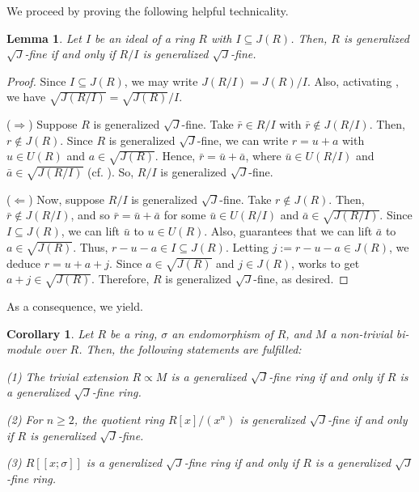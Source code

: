 \documentclass[12pt]{amsart}
\newtheorem{lemma}[theorem]{Lemma}
\newtheorem{corollary}[theorem]{Corollary}
\theoremstyle{definition}
\begin{document}
We proceed by proving the following helpful technicality.

\begin{lemma}\label{2.10}
Let \( I \) be an ideal of a ring \( R \) with \( I \subseteq J(R) \). Then, \( R \) is generalized $\sqrt{J}$-fine if and only if \( R/I \) is generalized $\sqrt{J}$-fine.
\end{lemma}

\begin{proof}
Since \( I \subseteq J(R) \), we may write \( J(R/I) = J(R)/I \). Also, activating \cite[Lemma 2.1(5)]{DDE}, we have \(\sqrt{J(R/I)} = \sqrt{J(R)}/I\).
	
(\(\Rightarrow\)) Suppose \( R \) is generalized \(\sqrt{J}\)-fine. Take \( \bar{r} \in R/I \) with \( \bar{r} \notin J(R/I) \). Then, \( r \notin J(R) \). Since \( R \) is generalized \(\sqrt{J}\)-fine, we can write \( r = u + a \) with \( u \in U(R) \) and \( a \in \sqrt{J(R)} \). Hence, \( \bar{r} = \bar{u} + \bar{a} \), where \( \bar{u} \in U(R/I) \) and \( \bar{a} \in \sqrt{J(R/I)} \) (cf. \cite[Lemma 2.1(5)]{DDE}). So, \( R/I \) is generalized \(\sqrt{J}\)-fine.
	
(\(\Leftarrow\)) Now, suppose \( R/I \) is generalized \(\sqrt{J}\)-fine. Take \( r \notin J(R) \). Then, \( \bar{r} \notin J(R/I) \), and so \( \bar{r} = \bar{u} + \bar{a} \) for some \( \bar{u} \in U(R/I) \) and \( \bar{a} \in \sqrt{J(R/I)} \). Since \( I \subseteq J(R) \), we can lift \( \bar{u} \) to \( u \in U(R) \). Also, \cite[Lemma 2.1(5)]{DDE} guarantees that we can lift \( \bar{a} \) to \( a \in \sqrt{J(R)} \). Thus, \( r - u - a \in I \subseteq J(R) \). Letting \( j := r - u - a \in J(R) \), we deduce
$
	r = u + a + j.
$
Since \( a \in \sqrt{J(R)} \) and \( j \in J(R) \), \cite[Lemma 2.11(1)]{DDE} works to get \( a + j \in \sqrt{J(R)} \). Therefore, \( R \) is generalized \(\sqrt{J}\)-fine, as desired.
\end{proof}

As a consequence, we yield.

\begin{corollary}
Let \( R \) be a ring, \( \sigma \) an endomorphism of \( R \), and \( M \) a non-trivial bi-module over \( R \). Then, the following statements are fulfilled:
	
(1) The trivial extension \( R \propto M \) is a generalized \(\sqrt{J}\)-fine ring if and only if \( R \) is a generalized \(\sqrt{J}\)-fine ring.
	
(2) For \( n \ge 2 \), the quotient ring \( R[x]/(x^n) \) is generalized \(\sqrt{J}\)-fine if and only if \( R \) is generalized \(\sqrt{J}\)-fine.

(3) \( R[[x;\sigma]] \) is a generalized \(\sqrt{J}\)-fine ring if and only if \( R \) is a generalized \(\sqrt{J}\)-fine ring.
\end{corollary}
\end{document}
